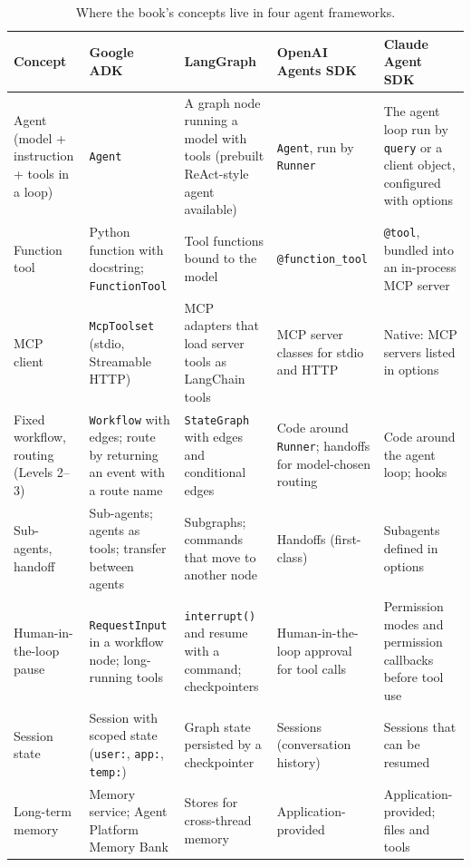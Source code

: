 \begin{table}[htbp]
\centering
\scriptsize
\setlength{\tabcolsep}{3.5pt}
\caption{Where the book's concepts live in four agent frameworks.}
\label{tab:mapping}
\begin{tabularx}{\textwidth}{@{}>{\raggedright\arraybackslash}p{2.1cm}>{\raggedright\arraybackslash}X>{\raggedright\arraybackslash}X>{\raggedright\arraybackslash}X>{\raggedright\arraybackslash}X@{}}
\toprule
Concept & Google ADK & LangGraph & OpenAI Agents SDK & Claude Agent SDK \\
\midrule
Agent (model + instruction + tools in a loop) & \texttt{Agent} & A graph node running a model with tools (prebuilt ReAct-style agent available) & \texttt{Agent}, run by \texttt{Runner} & The agent loop run by \texttt{query} or a client object, configured with options \\
Function tool & Python function with docstring; \texttt{FunctionTool} & Tool functions bound to the model & \texttt{@function\_tool} & \texttt{@tool}, bundled into an in-process MCP server \\
MCP client & \texttt{McpToolset} (stdio, Streamable HTTP) & MCP adapters that load server tools as LangChain tools & MCP server classes for stdio and HTTP & Native: MCP servers listed in options \\
Fixed workflow, routing (Levels 2--3) & \texttt{Workflow} with edges; route by returning an event with a route name & \texttt{StateGraph} with edges and conditional edges & Code around \texttt{Runner}; handoffs for model-chosen routing & Code around the agent loop; hooks \\
Sub-agents, handoff & Sub-agents; agents as tools; transfer between agents & Subgraphs; commands that move to another node & Handoffs (first-class) & Subagents defined in options \\
Human-in-the-loop pause & \texttt{RequestInput} in a workflow node; long-running tools & \texttt{interrupt()} and resume with a command; checkpointers & Human-in-the-loop approval for tool calls & Permission modes and permission callbacks before tool use \\
Session state & Session with scoped state (\texttt{user:}, \texttt{app:}, \texttt{temp:}) & Graph state persisted by a checkpointer & Sessions (conversation history) & Sessions that can be resumed \\
Long-term memory & Memory service; Agent Platform Memory Bank & Stores for cross-thread memory & Application-provided & Application-provided; files and tools \\

\end{tabularx}
\end{table}
